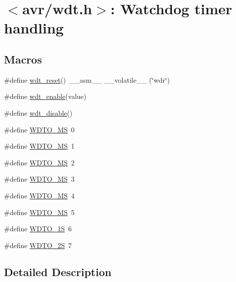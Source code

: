 \hypertarget{group__avr__watchdog}{}\section{$<$avr/wdt.h$>$\+: Watchdog timer handling}
\label{group__avr__watchdog}
\subsection*{Macros}
\begin{DoxyCompactItemize}
\item 
\#define \hyperlink{group__avr__watchdog_ga9e52c54d10b6a6a7ce04aaaa4abea51f}{wdt\+\_\+reset}()~\+\_\+\+\_\+asm\+\_\+\+\_\+ \+\_\+\+\_\+volatile\+\_\+\+\_\+ (\char`\"{}wdr\char`\"{})
\item 
\#define \hyperlink{group__avr__watchdog_ga14508e42cbce6fc63763730669f29974}{wdt\+\_\+enable}(value)  
\item 
\#define \hyperlink{group__avr__watchdog_gab3784e1b871d61ed338da5658184b725}{wdt\+\_\+disable}()
\item 
\#define \hyperlink{group__avr__watchdog_gad45893280f49113ffc2e67e1d741f29d}{W\+D\+T\+O\+\_\+MS}~0
\item 
\#define \hyperlink{group__avr__watchdog_ga057dd21dc54e71de0e20d8bd5734915d}{W\+D\+T\+O\+\_\+MS}~1
\item 
\#define \hyperlink{group__avr__watchdog_ga7a5b072c51c05a34cc38111f0e6724e5}{W\+D\+T\+O\+\_\+MS}~2
\item 
\#define \hyperlink{group__avr__watchdog_ga7d028bcdb4a4103549fc6fb4ec07fbcd}{W\+D\+T\+O\+\_\+MS}~3
\item 
\#define \hyperlink{group__avr__watchdog_ga66d5f50cc76b92c76900d77ef577d53e}{W\+D\+T\+O\+\_\+MS}~4
\item 
\#define \hyperlink{group__avr__watchdog_gacf89fc5fb6c8aa9efaadb86872cfbcdf}{W\+D\+T\+O\+\_\+MS}~5
\item 
\#define \hyperlink{group__avr__watchdog_ga36302e15f38a4eeb8a328724bb8165e9}{W\+D\+T\+O\+\_\+1S}~6
\item 
\#define \hyperlink{group__avr__watchdog_ga05fc682d276a36d8cc4e9178340ff004}{W\+D\+T\+O\+\_\+2S}~7
\end{DoxyCompactItemize}


\subsection{Detailed Description}

